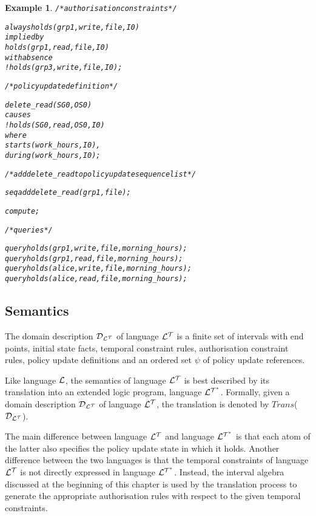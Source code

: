 \documentclass[11pt]{report}
\newtheorem{vexample}{Example}[chapter]
\newenvironment{vverbatim}
{
  \begin{alltt}
}
{
  \vspace{-\baselineskip}
  \end{alltt}
}
\begin{document}
\begin{vexample}
\begin{vverbatim}
  /* authorisation constraints */

  always holds(grp1, write, file, I0)
    implied by
      holds(grp1, read, file, I0)
    with absence
      !holds(grp3, write, file, I0);

  /* policy update definition */

  delete\_read(SG0, OS0)
    causes
      !holds(SG0, read, OS0, I0)
    where
      starts(work\_hours, I0),
      during(work\_hours, I0);

  /* add delete\_read to policy update sequence list */

  seq add delete_read(grp1, file);

  compute;

  /* queries */

  query holds(grp1, write, file, morning\_hours);
  query holds(grp1, read, file, morning\_hours);
  query holds(alice, write, file, morning\_hours);
  query holds(alice, read, file, morning\_hours);
          \end{vverbatim}
        \end{vexample}

      \subsection{Semantics}

        The domain description ${\cal D_{L^T}}$ of language ${\cal L^T}$ is
        a finite set of intervals with end points, initial state facts,
        temporal constraint rules, authorisation constraint rules, policy
        update definitions and an ordered set $\psi$ of policy update
        references.

        Like language ${\cal L}$, the semantics of language ${\cal L^T}$ is
        best described by its translation into an extended logic program,
        language ${\cal L^{T^*}}$. Formally, given a domain description
        ${\cal D_{L^T}}$ of language ${\cal L^T}$, the translation is denoted
        by $Trans$(${\cal D_{L^T}}$).

        The main difference between language ${\cal L^T}$ and language
        ${\cal L^{T^*}}$ is that each atom of the latter also specifies the
        policy update state in which it holds. Another difference between the
        two languages is that the temporal constraints of language ${\cal L^T}$
        is not directly expressed in language ${\cal L^{T^*}}$. Instead, the
        interval algebra discussed at the beginning of this chapter is used by
        the translation process to generate the appropriate authorisation rules
        with respect to the given temporal constraints.
\end{document}
